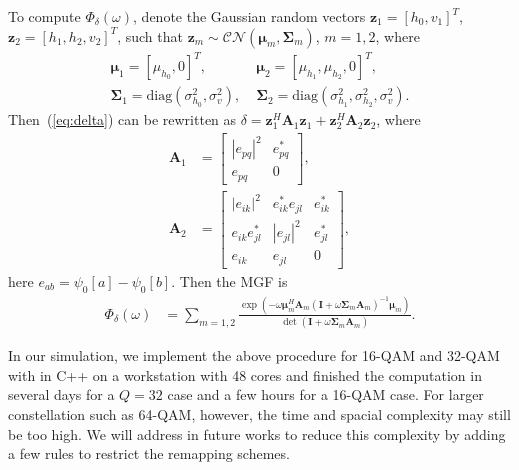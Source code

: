 \documentclass[journal]{IEEEtran}
\begin{document}
To compute $\Phi_{\delta}(\omega)$, denote the Gaussian random vectors
$\mathbf{z}_1 = [h_0, v_1]^T$, $\mathbf{z}_{2} = [h_1, h_2, v_2]^T$, such
that $\mathbf{z}_m\sim\mathcal{CN}(\bm{\mu}_m, \mathbf{\Sigma}_m)$, $m=1,2$,
where
\begin{align}
    \bm{\mu}_1 = [\mu_{h_0}, 0]^T,& \; \bm{\mu}_{2} = [\mu_{h_1}, \mu_{h_2},
    0]^T,
    \\
    \mathbf{\Sigma}_1 = \mbox{diag}\left(\sigma_{h_0}^2, \sigma_v^2\right), & \;
    \mathbf{\Sigma}_2 = \mbox{diag}\left(\sigma_{h_1}^2, \sigma_{h_2}^2,
    \sigma_v^2\right).
\end{align}
Then~(\ref{eq:delta}) can be rewritten as $\delta =
\mathbf{z}_1^H\mathbf{A}_1\mathbf{z}_1 +
\mathbf{z}_{2}^H\mathbf{A}_{2}\mathbf{z}_{2}$, where
\begin{subequations}
    \begin{align}
        \mathbf{A}_1 & = \left[
            \begin{array}{cc}
                |e_{pq}|^2  & e_{pq}^* \\
                e_{pq} & 0
            \end{array}
        \right], \\
        \mathbf{A}_2 & = \left[
            \begin{array}{ccc}
            |e_{ik}|^2 & e_{ik}^*e_{jl} & e_{ik}^*
            \\
            e_{ik}e_{jl}^* & |e_{jl}|^2 & e_{jl}^*
            \\
            e_{ik} & e_{jl} & 0
        \end{array}
        \right],
    \end{align}
\end{subequations}
here $e_{ab} = \psi_0[a] - \psi_0[b]$. Then the MGF
is
\begin{align}
    \Phi_{\delta}(\omega) & = \sum_{m=1,2}
    \frac{\exp(-\omega\bm{\mu}_m^H\mathbf{A}_m(\mathbf{I} +
    \omega\mathbf{\Sigma}_m\mathbf{A}_m)^{-1}\bm{\mu}_m)}{\det(\mathbf{I} +
    \omega\mathbf{\Sigma}_m\mathbf{A}_m)}.
\end{align}

In our simulation, we implement the above procedure for 16-QAM and 32-QAM with
in C++ on a workstation with 48 cores and
finished the computation in several days for a $Q=32$ case and a few hours for a
16-QAM case. For larger constellation such as 64-QAM, however, the time and
spacial complexity may still be too high. We will address in future works to
reduce this complexity by adding a few rules to restrict the remapping schemes.
\end{document}
